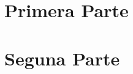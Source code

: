 \documentclass[12pt,oneside]{book}
\begin{document}
\pagestyle{empty}
\frontmatter
    
    
\mainmatter
    \part{Primera Parte}
    
      
    \part{Seguna Parte}
    
\backmatter
    
\end{document}
